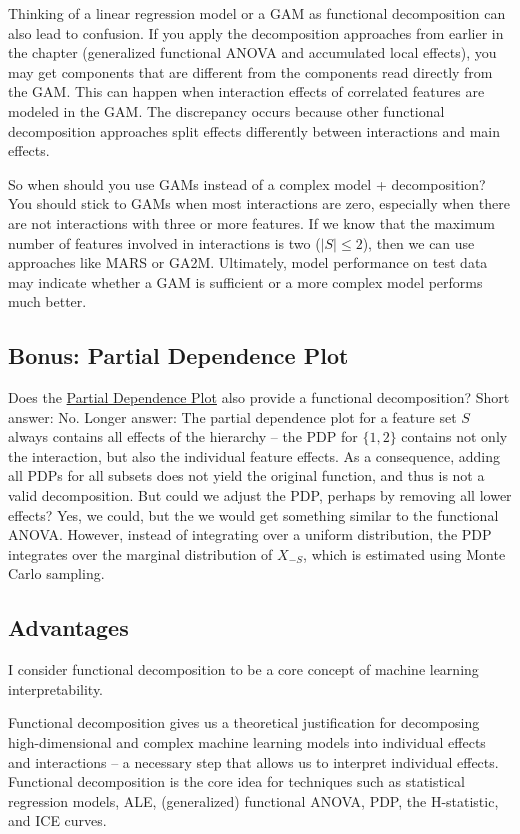 \documentclass[12pt,]{krantz}
\begin{document}
Thinking of a linear regression model or a GAM as functional
decomposition can also lead to confusion. If you apply the decomposition
approaches from earlier in the chapter (generalized functional ANOVA and
accumulated local effects), you may get components that are different
from the components read directly from the GAM. This can happen when
interaction effects of correlated features are modeled in the GAM. The
discrepancy occurs because other functional decomposition approaches
split effects differently between interactions and main effects.

So when should you use GAMs instead of a complex model + decomposition?
You should stick to GAMs when most interactions are zero, especially
when there are not interactions with three or more features. If we know
that the maximum number of features involved in interactions is two
(\(|S|\leq{}2\)), then we can use approaches like MARS or GA2M.
Ultimately, model performance on test data may indicate whether a GAM is
sufficient or a more complex model performs much better.

\subsection{Bonus: Partial Dependence
Plot}\label{bonus-partial-dependence-plot}

Does the \protect\hyperlink{pdp}{Partial Dependence Plot} also provide a
functional decomposition? Short answer: No. Longer answer: The partial
dependence plot for a feature set \(S\) always contains all effects of
the hierarchy -- the PDP for \(\{1,2\}\) contains not only the
interaction, but also the individual feature effects. As a consequence,
adding all PDPs for all subsets does not yield the original function,
and thus is not a valid decomposition. But could we adjust the PDP,
perhaps by removing all lower effects? Yes, we could, but the we would
get something similar to the functional ANOVA. However, instead of
integrating over a uniform distribution, the PDP integrates over the
marginal distribution of \(X_{-S}\), which is estimated using Monte
Carlo sampling.

\subsection{Advantages}\label{advantages-8}

I consider functional decomposition to be a core concept of machine
learning interpretability.

Functional decomposition gives us a theoretical justification for
decomposing high-dimensional and complex machine learning models into
individual effects and interactions -- a necessary step that allows us
to interpret individual effects. Functional decomposition is the core
idea for techniques such as statistical regression models, ALE,
(generalized) functional ANOVA, PDP, the H-statistic, and ICE curves.
\end{document}
